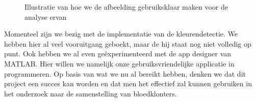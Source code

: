 \documentclass[a4paper,kulak]{kulakarticle}
\begin{document}
		\begin{figure}[H]
		\centering
		\qquad
		
		\caption{Illustratie van hoe we de afbeelding gebruiksklaar maken voor de analyse ervan}
		\label{fig: voorna}
		\end{figure}
		
		
		Momenteel zijn we bezig met de implementatie van de kleurendetectie. We hebben hier al veel vooruitgang geboekt, maar de hij staat nog niet volledig op punt. Ook hebben we al even geëxperimenteerd met de app designer van MATLAB. Hier willen we namelijk onze gebruiksvriendelijke applicatie in programmeren.
		Op basis van wat we nu al bereikt hebben, denken we dat dit project een succes kan worden en dat men het effectief zal kunnen gebruiken in het onderzoek naar de samenstelling van bloedklonters.
	
	\newpage
\end{document}
